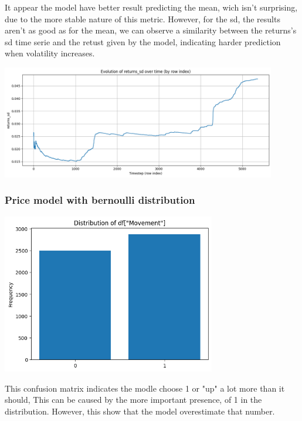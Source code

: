 \documentclass[letterpaper,11pt]{article}
\begin{document}
\bigskip
It appear the model have better result predicting the mean, wich isn't surprising, due to the more stable nature of this metric. However, for the sd, the results aren't as good as for the mean, we can observe a similarity between the returns's sd time serie and the retust given by the model, indicating harder prediction when volatility increases.

\begin{center}
\includegraphics[width=0.9\textwidth]{img/evo_rt_sd.png}
\end{center}


\bigskip

\subsubsection*{Price model with bernoulli distribution}


\begin{center}
\includegraphics[width=0.7\textwidth]{img/dist_mvt.png}
\end{center}

This confusion matrix indicates the modle choose 1 or "up" a lot more than it should, This can be caused by the more important presence, of 1 in the distribution. However, this show that the model overestimate that number.
\end{document}
